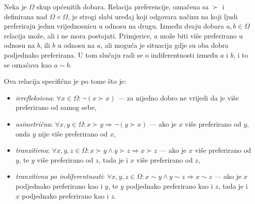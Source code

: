 \documentclass[lmodern, utf8, diplomski, numeric]{fer}
\begin{document}
  Neka je $\Omega$ skup općenitih dobara.
  Relacija preferencije, označena sa $\succ$ i definirana nad $\Omega \times \Omega$, je strogi slabi uređaj koji odgovara načinu na koji ljudi preferiraju jednu vrijednosnicu u odnosu na drugu.
  Između dvaju dobara $a, b \in \Omega$ relacija može, ali i ne mora postojati.
  Primjerice, $a$ može biti više preferirano u odnosu na $b$, ili $b$ u odnosu na $a$, ali moguća je situacija gdje su oba dobra podjednako preferirana.
  U tom slučaju radi se o indiferentnosti između $a$ i $b$, i to se označava kao $a \sim b$.

  Ova relacija specifična je po tome što je:
  \begin{itemize}
    \item \textit{irrefleksivna}: $\forall x \in \Omega\colon \neg \left( x \succ x \right)$ --- za nijedno dobro ne vrijedi da je više preferirano od samog sebe,
    \item \textit{asimetrična}: $\forall x, y \in \Omega\colon x \succ y \Rightarrow \neg \left( y \succ x \right)$ --- ako je $x$ više preferirano od $y$, onda $y$ nije više preferirano od $x$,
    \item \textit{tranzitivna}: $\forall x, y, z \in \Omega\colon x \succ y \wedge y \succ z \Rightarrow x \succ z$ --- ako je $x$ više preferirano od $y$, te $y$ više preferirano od $z$, tada je i $x$ više preferirano od $z$,
    \item \textit{tranzitivna po indiferentnosti}: $\forall x, y, z \in \Omega\colon x \sim y \wedge y \sim z \Rightarrow x \sim z$ --- ako je $x$ podjednako preferirano kao i $y$, te $y$ podjednako preferirano kao i $z$, tada je i $x$ podjednako preferirano kao i $z$.
  \end{itemize}
  
\end{document}
